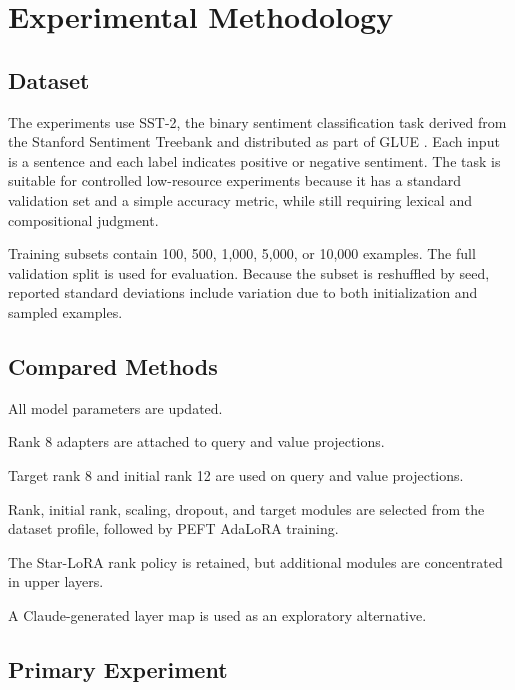 \chapter{Experimental Methodology}
\label{chap:experiments}

\section{Dataset}

The experiments use SST-2, the binary sentiment classification task derived from the Stanford
Sentiment Treebank \citep{socher2013recursive} and distributed as part of GLUE
\citep{wang2018glue}. Each input is a sentence and each label indicates positive or negative
sentiment. The task is suitable for controlled low-resource experiments because it has a standard
validation set and a simple accuracy metric, while still requiring lexical and compositional
judgment.

Training subsets contain 100, 500, 1,000, 5,000, or 10,000 examples. The full validation split is
used for evaluation. Because the subset is reshuffled by seed, reported standard deviations include
variation due to both initialization and sampled examples.

\section{Compared Methods}

\begin{description}[style=nextline]
  \item[Full fine-tuning] All model parameters are updated.
  \item[LoRA] Rank 8 adapters are attached to query and value projections.
  \item[AdaLoRA] Target rank 8 and initial rank 12 are used on query and value projections.
  \item[Star-LoRA] Rank, initial rank, scaling, dropout, and target modules are selected from the
  dataset profile, followed by PEFT AdaLoRA training.
  \item[Layer-wise heuristic] The Star-LoRA rank policy is retained, but additional modules are
  concentrated in upper layers.
  \item[Claude layer-wise] A Claude-generated layer map is used as an exploratory alternative.
\end{description}

\section{Primary Experiment}

